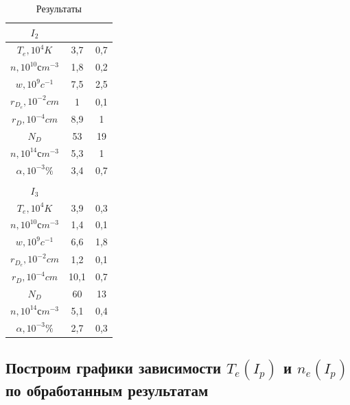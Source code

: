 \begin{table}[h!]
\begin{tabular}{|c|c|c|}
$I_2$  &    & \\ \hline
$T_e, 10^4 K      $                    & 3,7  & 0,7                    \\ \hline
$n, 10^{10} сm^{-3} $& 1,8  & 0,2                    \\ \hline
$w, 10^9 c^{-1}   $& 7,5  & 2,5                    \\ \hline
$r_{D_e}, 10^{-2} cm$           & 1    & 0,1                    \\ \hline
$r_{D}, 10^{-4} cm$              & 8,9  & 1                      \\ \hline
$N_D$ & 53   & 19             \\ \hline
$n, 10^14 сm^{-3} $& 5,3  & 1                      \\ \hline
$\alpha, 10^{-3}\%  $& 3,4  & 0,7                    \\ \hline
 \\
 \hline
$I_3$ &    & \\ \hline
$T_e, 10^4 K     $                   & 3,9  & 0,3                    \\ \hline
$n, 10^{10} сm^{-3} $& 1,4  & 0,1                    \\ \hline
$w, 10^9 c^{-1}   $& 6,6  & 1,8                    \\ \hline
$r_{D_e}, 10^{-2} cm$           & 1,2  & 0,1                    \\ \hline
$r_{D}, 10^{-4} cm $             & 10,1 & 0,7                    \\ \hline
$N_D              $                                   & 60   & 13  \\ \hline
$n, 10^{14} сm^{-3}$ & 5,1  & 0,4                    \\ \hline
$\alpha, 10^{-3} \% $  & 2,7  & 0,3                    \\ \hline
\end{tabular}
\caption{ Результаты}
\end{table}

\newpage
\subsection{Построим графики зависимости $T_e(I_p)$ и $n_e(I_p)$ по обработанным результатам}

